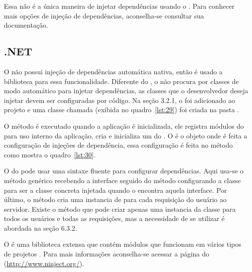Essa não é a única maneira de injetar dependências usando o . Para conhecer mais opções de injeção de dependências, aconselha-se consultar sua documentação.

\subsection{.NET}

O  não possui injeção de dependências automática nativa, então é usado a biblioteca  para essa funcionalidade. Diferente do , o  não procura por classes de modo automático para injetar dependências, as classes que o desenvolvedor deseja injetar devem ser configuradas por código. Na seção 3.2.1, o  foi adicionado ao projeto e uma classe chamada  (exibida no quadro~\ref{lst:29}) foi criada na pasta . 


O método  é executado quando a aplicação é inicializada, ele registra módulos do  para uso interno da aplicação, cria e inicializa um  do . O  é o objeto onde é feita a configuração de injeções de dependência, essa configuração é feita no método  como mostra o quadro~\ref{lst:30}.


O  do  pode usar uma sintaxe fluente para configurar dependências. Aqui usa-se o método genérico  recebendo a interface  seguido do método  configurando a classe  para ser a classe concreta injetada quando o  encontra aquela interface. Por último, o método  cria uma instancia de  para cada requisição do usuário ao servidor. Existe o método  que pode criar apenas uma instancia da classe para todos os usuários e todas as requisições, mas a necessidade de se utilizar  é abordada na seção 6.3.2.

O  é uma biblioteca extensa que contém módulos que funcionam em vários tipos de projetos . Para mais informações aconselha-se acessar a página do  (\url{http://www.ninject.org/}).

